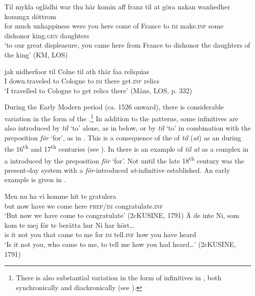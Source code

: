 \documentclass[output=paper]{langscibook}
\begin{document}
\ea
\label{ex:kalm:10}
\ea  \label{ex:kalm:10a}
\gll Til mykla oglädhi war thu här komin aff franz til at göra nakan wanhedher konungx döttrom\\
for much unhappiness were you here come of France to \textsc{im} make.\textsc{inf} some dishonor king.\textsc{gen} daughters\\
\glt ‘to our great displeasure, you came here from France to dishonor the daughters of the king’ (KM, LOS)

\ex\label{ex:kalm:10b}
\gll jak nidherfoor til Colne til ath thär faa reliquias\\
 I down.traveled to Cologne to \textsc{im} there get.\textsc{inf} relics\\
\glt ‘I travelled to Cologne to get relics there’ (Måns, LOS, p. 332)
\z 
\z 


During the Early Modern period (ca. 1526 onward), there is considerable variation in the form of the .\footnote{There is also substantial variation in the form of  infinitives in , both synchronically and diachronically (see \citealt{Demske2011}).}  In addition to the  patterns, some  infinitives are also introduced by \textit{til} ‘to’ alone, as in  below, or by \textit{til} ‘to’ in combination with the preposition \textit{för} ‘for’, as in . This is a consequence of the  of \textit{til} (\textit{at}) as an  during the 16\textsuperscript{th} and 17\textsuperscript{th} centuries (see \cites[]{Kalm2014}[]{Kalm2016Prepositioner}[203–221]{Kalm2016Satsekvivalenta}). In  there is an example of \textit{til at} as a complex  in a  introduced by the preposition \textit{för} ‘for’. Not until the late 18\textsuperscript{th} century was the present-day system with a \textit{för}{}-introduced \textit{at}{}-infinitive established. An early example is given in . 


\ea
\label{ex:kalm:11}
\ea  \label{ex:kalm:11a}
\gll Men nu ha vi komme hit te gratulera\\
but now have we come here \textsc{prep}/\textsc{im} congratulate.\textsc{inf}\\
\glt ‘But now we have come to congratulate’ (2cKUSINE, 1791) 
\ex  \label{ex:kalm:11b}
\gll Ä de inte Ni, som kom te mej för te berätta hur Ni har hört…\\
is it not you that came to me for \textsc{im} tell.\textsc{inf} how you have heard\\
\glt ‘Is it not you, who came to me, to tell me how you had heard…’ (2cKUSINE, 1791)
\end{document}
